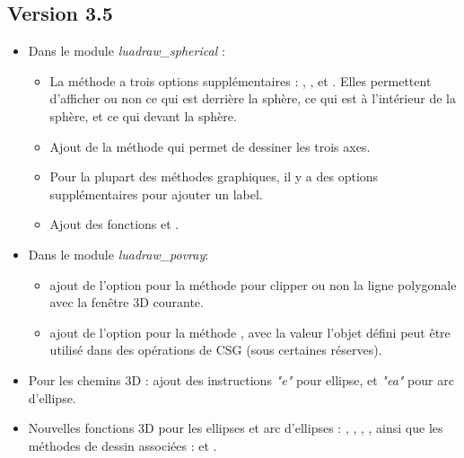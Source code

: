 \subsection{Version 3.5}

\begin{itemize}
    \item Dans le module \emph{luadraw\_spherical} :
        \begin{itemize}
            \item La méthode  a trois options supplémentaires : , , et . Elles permettent d'afficher ou non ce qui est derrière la sphère, ce qui est à l'intérieur de la sphère, et ce qui devant la sphère.
            \item Ajout de la méthode  qui permet de dessiner les trois axes.
            \item Pour la plupart des méthodes graphiques, il y a des options supplémentaires pour ajouter un label.
            \item Ajout des fonctions  et .
        \end{itemize}

    \item Dans le module \emph{luadraw\_povray}: 
        \begin{itemize}
            \item ajout de l'option  pour la méthode   pour clipper ou non la ligne polygonale avec la fenêtre 3D courante.
            
            \item ajout de l'option  pour la méthode , avec la valeur \true l'objet défini peut être utilisé dans des opérations de CSG (sous certaines réserves).
        \end{itemize}

    \item Pour les chemins 3D : ajout des instructions \emph{"e"} pour ellipse, et \emph{"ea"} pour arc d'ellipse.
    
    \item  Nouvelles fonctions 3D pour les ellipses et arc d'ellipses : , , , , ainsi que les méthodes de dessin associées :  et .


\end{itemize}
